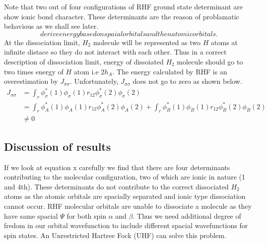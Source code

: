 \documentclass[11pt]{article}   	%
\begin{document}
	Note that two out of four configurations of RHF ground state determinant are show ionic bond character. These determinants are the reason of
	problamatic behavious as we shall see later. \\
	\begin{equation}
	derive energy based on spaial orbitals and then atomic orbitals. 
	\end{equation}
	At the dissociation limit, $H_2$ molecule will be represented as two $H$ atoms at infinite distace so they do not interact with each other. 
	Thus in a correct description of dissociation limit, energy of dissoiated $H_2$ molecule should go to two times energy of $H$ atom i.e 
	$2 h_A$. The energy calculated by RHF is an overestimation by $J_{\sigma \sigma}$. 
	Unfortunately, $J_{\sigma \sigma}$ does not go to zero as shown below. \\
	\begin{equation}
	\begin{split}
		J_{\sigma \sigma} &=\int_r \phi_{\sigma}^*(1) \phi_{\sigma}(1)r_{12}\phi_{\sigma}^*(2) \phi_{\sigma}(2)\\
			&=\int_r \phi_A^*(1) \phi_A(1)r_{12}\phi_A^*(2) \phi_A(2)+\int_r \phi_B^*(1) \phi_B(1)r_{12}\phi_B^*(2) \phi_B(2)\\
			&\neq 0
	\end{split}
	\end{equation}
	\subsection{Discussion of results}
	If we look at equation x carefully we find that there are four determinants contributing to the molecular configuration, two of which are ionic in nature (1 and 4th). 
	These determinants do not contribute to the correct dissociated $H_2$ atoms as the atomic orbitals are spacially separated and ionic type dissociation cannot occur. 
	RHF molecular orbitals are unable to dissociate a molecule as they have same spacial $\Psi$ for both spin $\alpha$ and $\beta$. Thus we need additional degree of fredom in our orbital wavefunction to include different spacial wavefunctions for spin states. An Unrestricted 
	Hartree Fock (UHF) can solve this problem. \\
\end{document}
